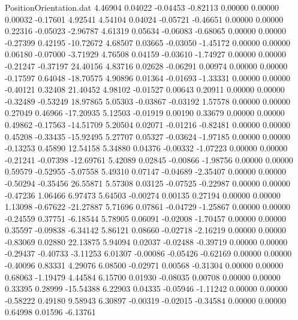 \begin{filecontents}{PositionOrientation.dat}
   4.46904    0.04022   -0.04453    -0.82113    0.00000    0.00000    0.00032   -0.17601    4.92541
   4.54104    0.04024   -0.05721    -0.46651    0.00000    0.00000    0.22316   -0.05023   -2.96787
   4.61319    0.05634   -0.06083    -0.68065    0.00000    0.00000   -0.27399    0.42195  -10.72672
   4.68507    0.03665   -0.03050    -1.45172    0.00000    0.00000    0.06180   -0.07000   -3.71929
   4.76508    0.04159   -0.03610    -1.74927    0.00000    0.00000   -0.21247   -0.37197   24.40156
   4.83716    0.02628   -0.06291     0.00974    0.00000    0.00000   -0.17597    0.64048  -18.70575
   4.90896    0.01364   -0.01693    -1.33331    0.00000    0.00000   -0.40121    0.32408   21.40452
   4.98102   -0.01527    0.00643     0.20911    0.00000    0.00000   -0.32489   -0.53249   18.97865
   5.05303   -0.03867   -0.03192     1.57578    0.00000    0.00000    0.27049    0.46966  -17.20935
   5.12503   -0.01919    0.00190     0.33679    0.00000    0.00000    0.49862   -0.17563  -14.51709
   5.20504    0.02071   -0.01216    -0.82481    0.00000    0.00000    0.45208   -0.33435  -15.92495
   5.27707    0.05327   -0.03624    -1.97185    0.00000    0.00000   -0.13253    0.45890   12.54158
   5.34880    0.04376   -0.00332    -1.07223    0.00000    0.00000   -0.21241   -0.07398  -12.69761
   5.42089    0.02845   -0.00866    -1.98756    0.00000    0.00000    0.59579   -0.52955   -5.07558
   5.49310    0.07147   -0.04689    -2.35407    0.00000    0.00000   -0.50294   -0.35456   26.55871
   5.57308    0.03125   -0.07525    -0.22987    0.00000    0.00000   -0.47236    1.06466    6.97473
   5.64503   -0.00274    0.00135     0.27194    0.00000    0.00000    1.13098   -0.67622  -21.27887
   5.71696    0.07861   -0.04729    -1.25867    0.00000    0.00000   -0.24559    0.37751   -6.18544
   5.78905    0.06091   -0.02008    -1.70457    0.00000    0.00000    0.35597   -0.09838   -6.34142
   5.86121    0.08660   -0.02718    -2.16219    0.00000    0.00000   -0.83069    0.02880   22.13875
   5.94094    0.02037   -0.02488    -0.39719    0.00000    0.00000   -0.29437   -0.40733   -3.11253
   6.01307   -0.00086   -0.05426    -0.62169    0.00000    0.00000   -0.40096    0.83331    4.29076
   6.08500   -0.02971    0.00568    -0.31304    0.00000    0.00000    0.68063   -1.19479    4.44584
   6.15700    0.01930   -0.08035     0.00708    0.00000    0.00000    0.33395    0.28999  -15.54388
   6.22903    0.04335   -0.05946    -1.11242    0.00000    0.00000   -0.58222    0.49180    9.58943
   6.30897   -0.00319   -0.02015    -0.34584    0.00000    0.00000    0.64998    0.01596   -6.13761

\end{filecontents}
